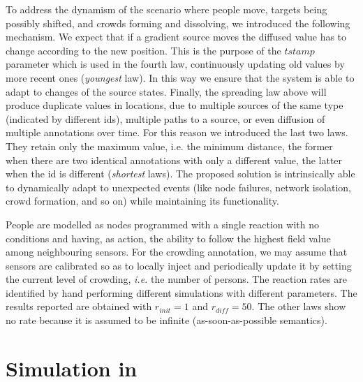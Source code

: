 \documentclass[12pt,a4paper,twoside,openright]{book}
\begin{document}
To address the dynamism of the scenario where people move, targets being possibly shifted, and crowds forming and dissolving, we introduced the following mechanism.
%
We expect that if a gradient source moves the diffused value has to change according to the new position. 
%
This is the purpose of the $tstamp$ parameter which is used in the fourth law, continuously updating old values by more recent ones (\emph{youngest} law).
%
In this way we ensure that the system is able to adapt to changes of the source states. 
%
Finally, the spreading law above will produce duplicate values in locations, due to multiple sources of the same type (indicated by different ids), multiple paths to a source, or even diffusion of multiple annotations over time. For this reason we introduced the last two laws. They retain only the maximum value, i.e. the minimum distance, the former when there are two identical annotations with only a different value, the latter when the id is different (\emph{shortest} laws).
%
The proposed solution is  intrinsically able to dynamically adapt to unexpected events (like node failures, network isolation, crowd formation, and so on) while maintaining its functionality.

People are modelled as nodes programmed with a single reaction with no conditions and having, as action, the ability to follow the highest field value among neighbouring sensors.
%
For the crowding annotation, we may assume that sensors are calibrated so as to locally inject and periodically update it by setting the current level of crowding, \emph{i.e.} the number of persons.
%
The reaction rates are identified by hand performing different simulations with different parameters. The results reported are obtained with $r_{init} = 1$ and $r_{diff} = 50$. The other laws show no rate because it is assumed to be infinite (as-soon-as-possible semantics).

\section{Simulation in \alchemist{}}
\end{document}

